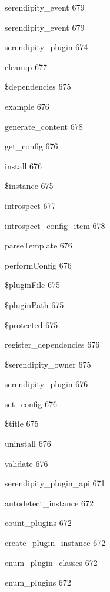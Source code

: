 \documentclass{book}
\renewcommand\subitem{\par}
\renewcommand\subsubitem{\par\hspace*{3mm}}
\begin{document}
\begin{multicols}{2}
\begin{osp-index}
    \subitem serendipity\_event\hspace{1mm} 679
      \subsubitem serendipity\_event\hspace{1mm} 679
    \subitem serendipity\_plugin\hspace{1mm} 674
      \subsubitem cleanup\hspace{1mm} 677
      \subsubitem \$dependencies\hspace{1mm} 675
      \subsubitem example\hspace{1mm} 676
      \subsubitem generate\_content\hspace{1mm} 678
      \subsubitem get\_config\hspace{1mm} 676
      \subsubitem install\hspace{1mm} 676
      \subsubitem \$instance\hspace{1mm} 675
      \subsubitem introspect\hspace{1mm} 677
      \subsubitem introspect\_config\_item\hspace{1mm} 678
      \subsubitem parseTemplate\hspace{1mm} 676
      \subsubitem performConfig\hspace{1mm} 676
      \subsubitem \$pluginFile\hspace{1mm} 675
      \subsubitem \$pluginPath\hspace{1mm} 675
      \subsubitem \$protected\hspace{1mm} 675
      \subsubitem register\_dependencies\hspace{1mm} 676
      \subsubitem \$serendipity\_owner\hspace{1mm} 675
      \subsubitem serendipity\_plugin\hspace{1mm} 676
      \subsubitem set\_config\hspace{1mm} 676
      \subsubitem \$title\hspace{1mm} 675
      \subsubitem uninstall\hspace{1mm} 676
      \subsubitem validate\hspace{1mm} 676
    \subitem serendipity\_plugin\_api\hspace{1mm} 671
      \subsubitem autodetect\_instance\hspace{1mm} 672
      \subsubitem count\_plugins\hspace{1mm} 672
      \subsubitem create\_plugin\_instance\hspace{1mm} 672
      \subsubitem enum\_plugin\_classes\hspace{1mm} 672
      \subsubitem enum\_plugins\hspace{1mm} 672

\end{osp-index}
\end{multicols}
\end{document}
